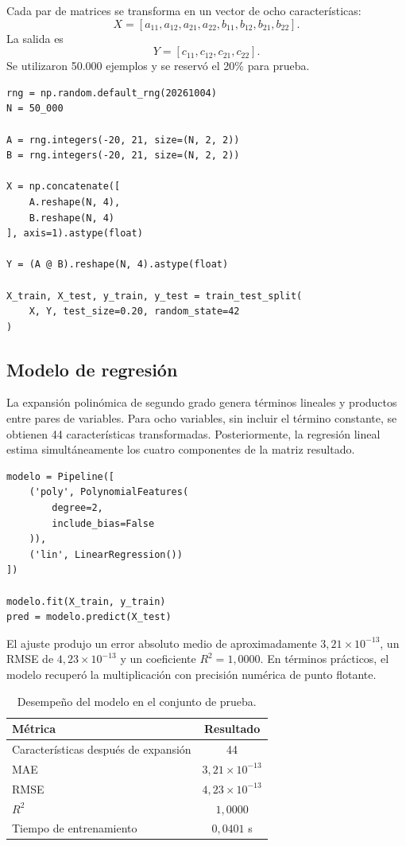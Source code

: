 \documentclass[14pt,twoside]{article}
\begin{document}
Cada par de matrices se transforma en un vector de ocho características:
\[
X=[a_{11},a_{12},a_{21},a_{22},b_{11},b_{12},b_{21},b_{22}].
\]
La salida es
\[
Y=[c_{11},c_{12},c_{21},c_{22}].
\]
Se utilizaron 50.000 ejemplos y se reservó el 20\% para prueba.

\begin{lstlisting}[style=pgpython,caption={Generación reproducible de las 50.000 multiplicaciones.}]
rng = np.random.default_rng(20261004)
N = 50_000

A = rng.integers(-20, 21, size=(N, 2, 2))
B = rng.integers(-20, 21, size=(N, 2, 2))

X = np.concatenate([
    A.reshape(N, 4),
    B.reshape(N, 4)
], axis=1).astype(float)

Y = (A @ B).reshape(N, 4).astype(float)

X_train, X_test, y_train, y_test = train_test_split(
    X, Y, test_size=0.20, random_state=42
)
\end{lstlisting}

\subsection{Modelo de regresión}

La expansión polinómica de segundo grado genera términos lineales y productos entre pares de variables. Para ocho variables, sin incluir el término constante, se obtienen 44 características transformadas. Posteriormente, la regresión lineal estima simultáneamente los cuatro componentes de la matriz resultado.

\begin{lstlisting}[style=pgpython,caption={Entrenamiento del modelo de regresión polinómica.}]
modelo = Pipeline([
    ('poly', PolynomialFeatures(
        degree=2,
        include_bias=False
    )),
    ('lin', LinearRegression())
])

modelo.fit(X_train, y_train)
pred = modelo.predict(X_test)
\end{lstlisting}

El ajuste produjo un error absoluto medio de aproximadamente $3,21\times10^{-13}$, un RMSE de $4,23\times10^{-13}$ y un coeficiente $R^2=1,0000$. En términos prácticos, el modelo recuperó la multiplicación con precisión numérica de punto flotante.

\begin{table}[H]
\centering
\caption{Desempeño del modelo en el conjunto de prueba.}
\begin{tabular}{lc}
\toprule
Métrica & Resultado \\
\midrule
Características después de expansión & 44 \\
MAE & $3,21\times10^{-13}$ \\
RMSE & $4,23\times10^{-13}$ \\
$R^2$ & $1,0000$ \\
Tiempo de entrenamiento & $0,0401$ s \\
\bottomrule
\end{tabular}
\end{table}
\end{document}
